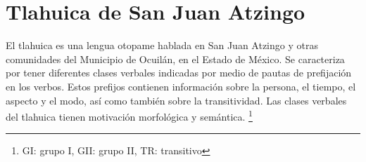 \section*{Tlahuica de San Juan Atzingo}

\noindent El tlahuica es una lengua otopame hablada en San Juan Atzingo y otras comunidades del Municipio de Ocuilán, en el Estado de México. Se caracteriza por tener diferentes clases verbales indicadas por medio de pautas de prefijación en los verbos. Estos prefijos contienen información sobre la persona, el tiempo, el aspecto y el modo, así como también sobre la transitividad. Las clases verbales del tlahuica tienen motivación morfológica y semántica.
\footnote{GI: grupo I, GII: grupo II, TR: transitivo}


\vspace{0.5cm}

